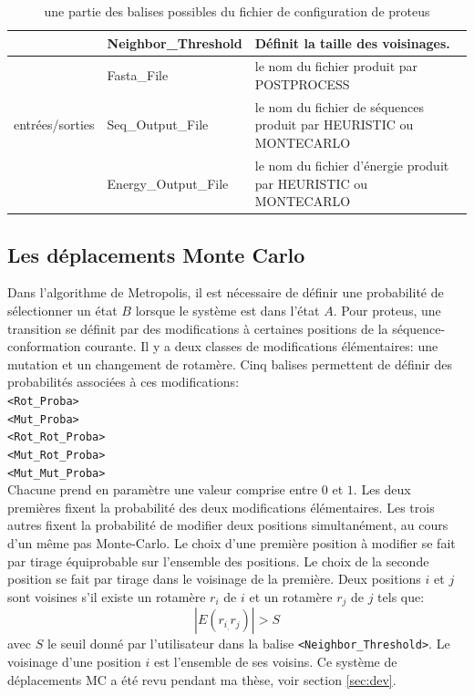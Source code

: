 \begin{table}[!htbp]
\begin{tabular}{|p{0.2\linewidth}|p{0.32\linewidth}|p{0.48\linewidth}|}
                         & Neighbor\_Threshold & Définit la taille des voisinages.\\   \hline
        
                         & Fasta\_File & le nom du fichier produit par POSTPROCESS\\    \cline{2-3}             
        entrées/sorties     & Seq\_Output\_File & le nom  du fichier de séquences produit par HEURISTIC ou MONTECARLO\\    \cline{2-3}             
                         & Energy\_Output\_File & le nom du fichier d'énergie produit par HEURISTIC ou MONTECARLO\\   \hline              

      \end{tabular} 

      \caption{une partie des balises possibles du fichier de configuration de proteus}      

      \label{tab:balise_proteus}
      

    \end{table}
    

\subsection{Les déplacements Monte Carlo}
\label{sub:MC_move}  
Dans l'algorithme de Metropolis, il est nécessaire de définir une probabilité de sélectionner un état $B$ lorsque le système est dans l'état $A$. Pour proteus, une transition se définit par des modifications à certaines positions de la séquence-conformation courante. Il y a deux classes de modifications élémentaires: une mutation et un changement de rotamère. Cinq balises permettent de définir des probabilités associées à ces modifications: \\
\verb!<Rot_Proba>! \\
\verb!<Mut_Proba>! \\
\verb!<Rot_Rot_Proba>! \\
\verb!<Mut_Rot_Proba>! \\
\verb!<Mut_Mut_Proba>!  \\
Chacune prend en paramètre une valeur comprise entre $0$ et $1$. Les deux premières fixent la probabilité des deux modifications élémentaires. Les trois autres fixent la probabilité de modifier deux positions simultanément, au cours d'un même pas Monte-Carlo. Le choix d'une première position à modifier se fait par tirage équiprobable sur l'ensemble des positions. Le choix de la seconde position se fait par tirage dans le voisinage de la première. Deux positions $i$ et $j$ sont voisines s'il existe un rotamère $r_i$ de $i$ et un rotamère $r_j$ de $j$ tels que:
\begin{displaymath}
  \label{eq:voisin}
 | E(r_i_,r_j) | > S
\end{displaymath} 
avec $S$ le seuil donné par l'utilisateur dans la balise \verb!<Neighbor_Threshold>!. Le voisinage d'une position $i$ est l'ensemble de ses voisins. Ce système de déplacements MC a été revu pendant ma thèse, voir section \vref{sec:dev}.

